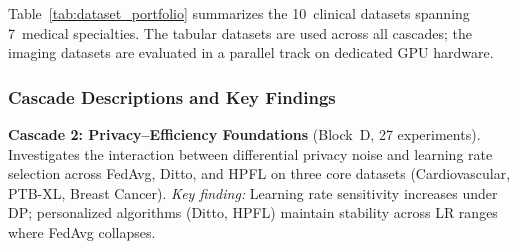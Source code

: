 \documentclass[conference]{IEEEtran}
\begin{document}
Table~\ref{tab:dataset_portfolio} summarizes the 10~clinical datasets spanning 7~medical specialties. The tabular datasets are used across all cascades; the imaging datasets are evaluated in a parallel track on dedicated GPU hardware.

\begin{table}[htbp]
\centering
\caption{Clinical Dataset Portfolio for FL-EHDS Evaluation}
\label{tab:dataset_portfolio}
\end{table}

\subsubsection{Cascade Descriptions and Key Findings}

\noindent\textbf{Cascade 2: Privacy--Efficiency Foundations} (Block~D, 27 experiments). Investigates the interaction between differential privacy noise and learning rate selection across FedAvg, Ditto, and HPFL on three core datasets (Cardiovascular, PTB-XL, Breast Cancer). \textit{Key finding:} Learning rate sensitivity increases under DP; personalized algorithms (Ditto, HPFL) maintain stability across LR ranges where FedAvg collapses.
\end{document}
